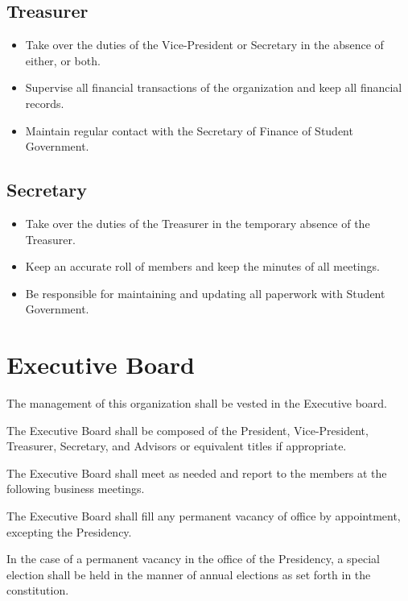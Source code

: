 \subsection{Treasurer}
\begin{itemize}
	\item Take over the duties of the Vice-President or Secretary in the absence of either, or both.
	\item Supervise all financial transactions of the organization and keep all financial records.
	\item Maintain regular contact with the Secretary of Finance of Student Government.
\end{itemize}
\subsection{Secretary}
\begin{itemize}
	\item Take over the duties of the Treasurer in the temporary absence of the Treasurer.
	\item Keep an accurate roll of members and keep the minutes of all meetings.
	\item Be responsible for maintaining and updating all paperwork with Student Government.
\end{itemize}

\section{Executive Board}
\begin{subroutines}
\item The management of this organization shall be vested in the Executive board.
\item The Executive Board shall be composed of the President, Vice-President, Treasurer, Secretary, and Advisors or equivalent titles if appropriate.
\item The Executive Board shall meet as needed and report to the members at the following business meetings.
\item The Executive Board shall fill any permanent vacancy of office by appointment, excepting the Presidency.
\item In the case of a permanent vacancy in the office of the Presidency, a special election shall be held in the manner of annual elections as set forth in the constitution.
\end{subroutines}

